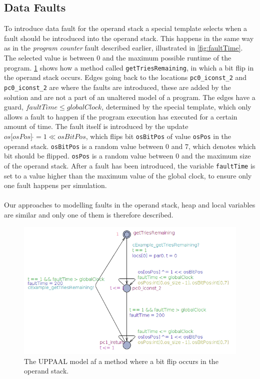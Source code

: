 \subsection{Data Faults}
To introduce data fault for the operand stack a special template selects when a fault should be introduced into the operand stack. This happens in the same way as in the \textit{program counter} fault described earlier, illustrated in \cref{fig:faultTime}. The selected value is between $0$ and the maximum possible runtime of the program. \cref{fig:opstackFlip} shows how a method called \texttt{getTriesRemaining}, in which a bit flip in the operand stack occurs. Edges going back to the locations \texttt{pc0\_iconst\_2} and \texttt{pc0\_iconst\_2} are where the faults are introduced, these are added by the solution and are not a part of an unaltered model of a program. The edges have a guard, $faultTime \leq globalClock$, determined by the special template, which only allows a fault to happen if the program execution has executed for a certain amount of time. The fault itself is introduced by the update $os\lbrack osPos \rbrack\:\hat{}= 1 \ll osBitPos$, which flips bit \texttt{osBitPos} of value \texttt{osPos} in the operand stack. \texttt{osBitPos} is a random value between $0$ and $7$, which denotes which bit should be flipped. \texttt{osPos} is a random value between $0$ and the maximum size of the operand stack. After a fault has been introduced, the variable \texttt{faultTime} is set to a value higher than the maximum value of the global clock, to ensure only one fault happens per simulation.\\\\
Our approaches to modelling faults in the operand stack, heap and local variables are similar and only one of them is therefore described.
\begin{figure}[H]
\centering
\includegraphics[width=\textwidth]{figures/reportExamples/opstackRewrite.png}
\caption{The UPPAAL model af a method where a bit flip occurs in the operand stack.}
\label{fig:opstackFlip}
\end{figure}
